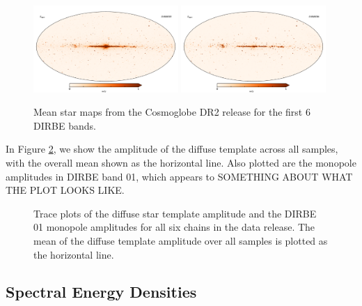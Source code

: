 \documentclass{aa}
\begin{document}
\begin{figure}
  \includegraphics[width=0.49\textwidth]{figs/starmaps/stars_mean_05.pdf}
  \includegraphics[width=0.49\textwidth]{figs/starmaps/stars_mean_06.pdf} \\
  \caption{Mean star maps from the Cosmoglobe DR2 release for the first 6 DIRBE bands. }
  \label{fig:starsT}
\end{figure}

In Figure \ref{fig:amptrace}, we show the amplitude of the diffuse template across all samples, with the overall mean shown as the horizontal line. Also plotted are the monopole amplitudes in DIRBE band 01, which appears to SOMETHING ABOUT WHAT THE PLOT LOOKS LIKE.

\begin{figure}
  \centering
  \caption{Trace plots of the diffuse star template amplitude and the DIRBE 01 monopole amplitudes for all six chains in the data release. The mean of the diffuse template amplitude over all samples is plotted as the horizontal line.}
  \label{fig:amptrace}
\end{figure}


\subsection{Spectral Energy Densities}
\end{document}
